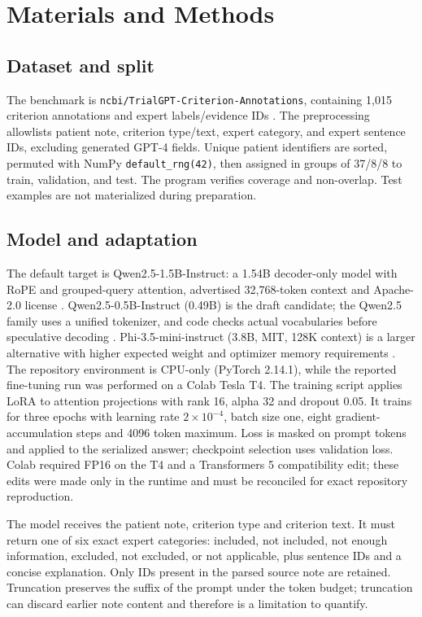 \documentclass[conference]{IEEEtran}
\begin{document}
\section{Materials and Methods}
\subsection{Dataset and split}
The benchmark is \texttt{ncbi/TrialGPT-Criterion-Annotations}, containing 1,015 criterion annotations and expert labels/evidence IDs \cite{dataset}. The preprocessing allowlists patient note, criterion type/text, expert category, and expert sentence IDs, excluding generated GPT-4 fields. Unique patient identifiers are sorted, permuted with NumPy \texttt{default\_rng(42)}, then assigned in groups of 37/8/8 to train, validation, and test. The program verifies coverage and non-overlap. Test examples are not materialized during preparation.

\subsection{Model and adaptation}
The default target is Qwen2.5-1.5B-Instruct: a 1.54B decoder-only model with RoPE and grouped-query attention, advertised 32,768-token context and Apache-2.0 license \cite{qwen15}. Qwen2.5-0.5B-Instruct (0.49B) is the draft candidate; the Qwen2.5 family uses a unified tokenizer, and code checks actual vocabularies before speculative decoding \cite{qwen05}. Phi-3.5-mini-instruct (3.8B, MIT, 128K context) is a larger alternative with higher expected weight and optimizer memory requirements \cite{phi}. The repository environment is CPU-only (PyTorch 2.14.1), while the reported fine-tuning run was performed on a Colab Tesla T4. The training script applies LoRA to attention projections with rank 16, alpha 32 and dropout 0.05. It trains for three epochs with learning rate $2\times10^{-4}$, batch size one, eight gradient-accumulation steps and 4096 token maximum. Loss is masked on prompt tokens and applied to the serialized answer; checkpoint selection uses validation loss. Colab required FP16 on the T4 and a Transformers 5 compatibility edit; these edits were made only in the runtime and must be reconciled for exact repository reproduction.

The model receives the patient note, criterion type and criterion text. It must return one of six exact expert categories: included, not included, not enough information, excluded, not excluded, or not applicable, plus sentence IDs and a concise explanation. Only IDs present in the parsed source note are retained. Truncation preserves the suffix of the prompt under the token budget; truncation can discard earlier note content and therefore is a limitation to quantify.
\end{document}
